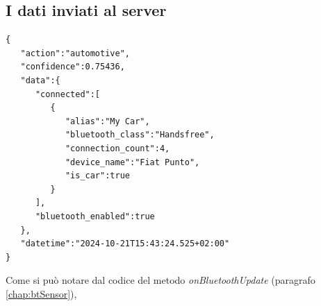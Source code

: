 \subsection{I dati inviati al server}

\begin{verbatim}
{
   "action":"automotive",
   "confidence":0.75436,
   "data":{
      "connected":[
         {
            "alias":"My Car",
            "bluetooth_class":"Handsfree",
            "connection_count":4,
            "device_name":"Fiat Punto",
            "is_car":true
         }
      ],
      "bluetooth_enabled":true
   },
   "datetime":"2024-10-21T15:43:24.525+02:00"
}
\end{verbatim}
Come si può notare dal codice del metodo \textit{onBluetoothUpdate} (paragrafo \ref{chap:btSensor}),

